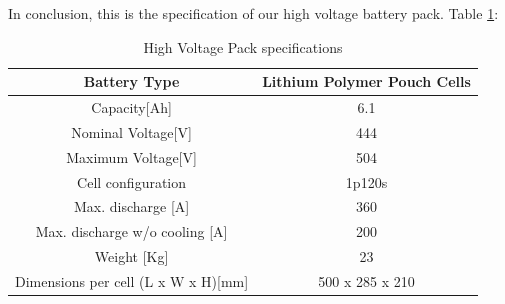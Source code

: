 In conclusion, this is the specification of our high voltage battery pack. Table \ref{high-voltage-specs}:

\begin{table}[h]
    \centering
    \begin{tabular}{|c|c|}
       \hline
       Battery Type & Lithium Polymer Pouch Cells\\
       \hline
       Capacity[Ah] & 6.1 \\
       \hline
       Nominal Voltage[V] & 444 \\
       \hline
       Maximum Voltage[V] & 504 \\
       Cell configuration & 1p120s \\
       \hline
       Max. discharge [A] & 360 \\
       \hline
       Max. discharge w/o cooling [A] & 200 \\
       \hline
       Weight [Kg] & 23 \\
       \hline 
       Dimensions per cell (L x W x H)[mm] & 500 x 285 x 210 \\
       \hline 
    \end{tabular}
    \caption{High Voltage Pack specifications}
    \label{high-voltage-specs}
\end{table}
